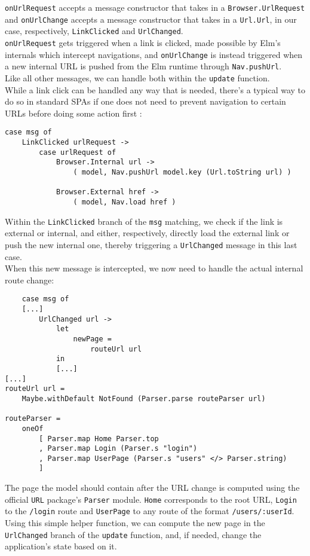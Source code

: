 \texttt{onUrlRequest} accepts a message constructor that takes in a \texttt{Browser.UrlRequest} and \texttt{onUrlChange} accepts a message constructor that takes in a \texttt{Url.Url}, in our case, respectively, \texttt{LinkClicked} and \texttt{UrlChanged}.\\
\texttt{onUrlRequest} gets triggered when a link is clicked, made possible by Elm's internals which intercept navigations, and \texttt{onUrlChange} is instead triggered when a new internal URL is pushed from the Elm runtime through \texttt{Nav.pushUrl}.\\
Like all other messages, we can handle both within the \texttt{update} function.\\

While a link click can be handled any way that is needed, there's a typical way to do so in standard SPAs if one does not need to prevent navigation to certain URLs before doing some action first \cite{noauthor_navigation_nodate}:
\begin{verbatim}
case msg of
    LinkClicked urlRequest ->
        case urlRequest of
            Browser.Internal url ->
                ( model, Nav.pushUrl model.key (Url.toString url) )

            Browser.External href ->
                ( model, Nav.load href )
\end{verbatim}

Within the \texttt{LinkClicked} branch of the \texttt{msg} matching, we check if the link is external or internal, and either, respectively, directly load the external link or push the new internal one, thereby triggering a \texttt{UrlChanged} message in this last case.\\

When this new message is intercepted, we now need to handle the actual internal route change:
\begin{verbatim}
    case msg of
    [...]
        UrlChanged url ->
            let
                newPage =
                    routeUrl url
            in
            [...]
[...]
routeUrl url =
    Maybe.withDefault NotFound (Parser.parse routeParser url)
    
routeParser =
    oneOf
        [ Parser.map Home Parser.top
        , Parser.map Login (Parser.s "login")
        , Parser.map UserPage (Parser.s "users" </> Parser.string)
        ]
\end{verbatim}
The page the model should contain after the URL change is computed using  the official \texttt{URL} package's \texttt{Parser} module. \texttt{Home} corresponds to the root URL, \texttt{Login} to the \texttt{/login} route and \texttt{UserPage} to any route of the format \texttt{/users/:userId}.\\
Using this simple helper function, we can compute the new page in the \texttt{UrlChanged} branch of the \texttt{update} function, and, if needed, change the application's state based on it.

